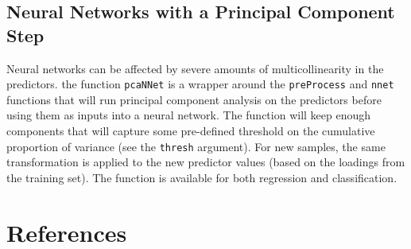 \documentclass[12pt]{article}
\begin{document}
\subsection{Neural Networks with a Principal Component Step}

Neural networks can be affected by severe amounts of multicollinearity in the predictors. the function \texttt{pcaNNet} is a wrapper around the \texttt{preProcess} and \texttt{nnet} functions that will run principal component analysis on the predictors before using them as inputs into a neural network. The function will keep enough components that will capture some pre-defined threshold on the cumulative proportion of variance (see the \texttt{thresh} argument). For new samples, the same transformation is applied to the new predictor values (based on the loadings from the training set). The function is available for both regression and classification. 

\section{References}
\end{document}
